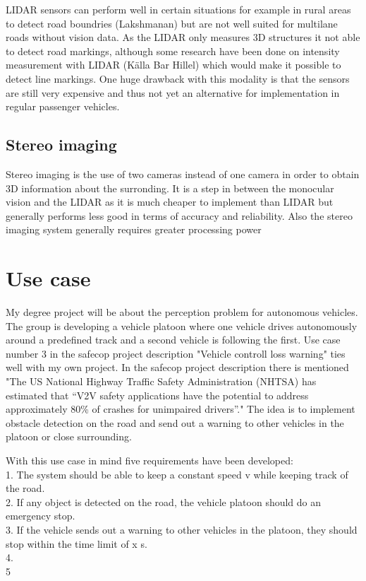 LIDAR sensors can perform well in certain situations for example in rural areas to detect road boundries (Lakshmanan) but are not well suited for multilane roads without vision data. As the LIDAR only measures 3D structures it not able to detect road markings, although some research have been done on intensity measurement with LIDAR (Källa Bar Hillel) which would make it possible to detect line markings. One huge drawback with this modality is that the sensors are still very expensive and thus not yet an alternative for implementation in regular passenger vehicles.
\subsection{Stereo imaging}
Stereo imaging is the use of two cameras instead of one camera in order to obtain 3D information about the surronding. It is a step in between the monocular vision and the LIDAR as it is much cheaper to implement than LIDAR but generally performs less good in terms of accuracy and reliability.  Also the stereo imaging system generally requires greater processing power 
          
\section{Use case}
My degree project will be about the perception problem for autonomous vehicles. The group is developing a vehicle platoon where one vehicle drives autonomously around a predefined track and a second vehicle is following the first. Use case number 3 in the safecop project description "Vehicle controll loss warning" ties well with my own project. In the safecop project description there is mentioned "The US National Highway Traffic Safety Administration (NHTSA) has estimated that “V2V safety
applications have the potential to address approximately 80\% of crashes for unimpaired drivers”." The idea is to implement obstacle detection on the road and send out a warning to other vehicles in the platoon or close surrounding.

With this use case in mind five requirements have been developed:\\
1. The system should be able to keep a constant speed v while keeping track of the road.\\
2. If any object is detected on the road, the vehicle platoon should do an emergency stop.\\
3. If the vehicle sends out a warning to other vehicles in the platoon, they should stop within the time limit of x s. \\
4. \\
5\\

